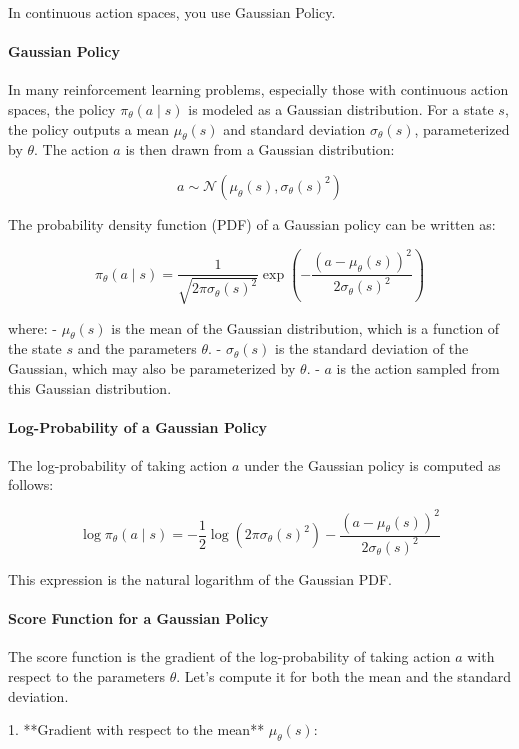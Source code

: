 \documentclass[10pt, oneside]{article}
\theoremstyle{definition}
\begin{document}
In continuous action spaces, you use Gaussian Policy. 

\paragraph{Gaussian Policy}

In many reinforcement learning problems, especially those with continuous action spaces, the policy $\pi_\theta(a \mid s)$ is modeled as a Gaussian distribution. For a state $s$, the policy outputs a mean $\mu_\theta(s)$ and standard deviation $\sigma_\theta(s)$, parameterized by $\theta$. The action $a$ is then drawn from a Gaussian distribution:

\[
a \sim \mathcal{N}(\mu_\theta(s), \sigma_\theta(s)^2)
\]

The probability density function (PDF) of a Gaussian policy can be written as:

\[
\pi_\theta(a \mid s) = \frac{1}{\sqrt{2 \pi \sigma_\theta(s)^2}} \exp\left( -\frac{(a - \mu_\theta(s))^2}{2 \sigma_\theta(s)^2} \right)
\]

where:
- $\mu_\theta(s)$ is the mean of the Gaussian distribution, which is a function of the state $s$ and the parameters $\theta$.
- $\sigma_\theta(s)$ is the standard deviation of the Gaussian, which may also be parameterized by $\theta$.
- $a$ is the action sampled from this Gaussian distribution.

\paragraph{Log-Probability of a Gaussian Policy}

The log-probability of taking action $a$ under the Gaussian policy is computed as follows:

\[
\log \pi_\theta(a \mid s) = -\frac{1}{2} \log(2 \pi \sigma_\theta(s)^2) - \frac{(a - \mu_\theta(s))^2}{2 \sigma_\theta(s)^2}
\]

This expression is the natural logarithm of the Gaussian PDF.

\paragraph{Score Function for a Gaussian Policy}

The score function is the gradient of the log-probability of taking action $a$ with respect to the parameters $\theta$. Let's compute it for both the mean and the standard deviation.

1. **Gradient with respect to the mean** $\mu_\theta(s)$:
   
\end{document}
